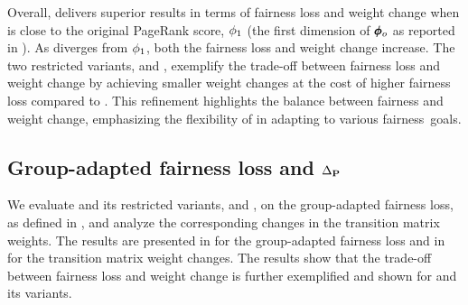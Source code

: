 \documentclass[sigconf, anonymous, review]{acmart}
\begin{document}
Overall, \fairgd delivers superior results in terms of fairness loss and weight change when \grouppr is close to the original PageRank score, $\phi_1$ (the first dimension of $\pmb{\phi}_o$ as reported in ). As \grouppr diverges from $\phi_1$, both the fairness loss and weight change increase. The two restricted variants, \fairgdrone and \fairgdrtwo, exemplify the trade-off between fairness loss and weight change by achieving smaller weight changes at the cost of higher fairness loss compared to \fairgd.
This refinement highlights the balance between fairness and weight change, 
emphasizing the flexibility of \fairgd in adapting to various fairness~goals.


\subsection{Group-adapted fairness loss and \texorpdfstring{$\Delta_\mathbf{{P}}$}{Delta $P$}}

We evaluate \crossgd and its restricted variants, \crossgdrone and \crossgdrtwo, on the group-adapted fairness loss, as defined in , and analyze the corresponding changes in the transition matrix weights. 
The results %
are presented in  for the group-adapted fairness loss 
and in  for the transition matrix weight changes.
The results show that the trade-off between fairness loss and weight change is further exemplified and shown for \crossgd and its variants.




\end{document}
